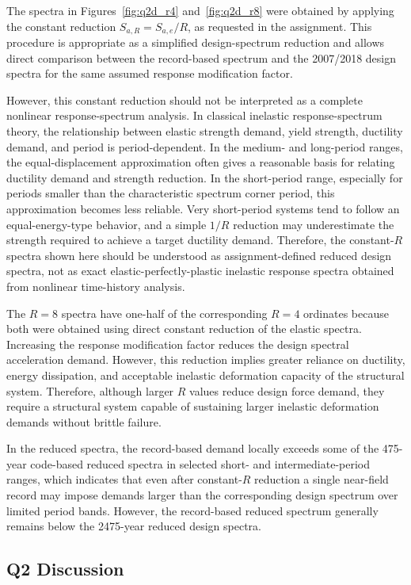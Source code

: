 ﻿\documentclass[12pt]{article}
\begin{document}
The spectra in Figures~\ref{fig:q2d_r4} and~\ref{fig:q2d_r8} were obtained by applying the constant reduction $S_{a,R}=S_{a,e}/R$, as requested in the assignment. This procedure is appropriate as a simplified design-spectrum reduction and allows direct comparison between the record-based spectrum and the 2007/2018 design spectra for the same assumed response modification factor.

However, this constant reduction should not be interpreted as a complete nonlinear response-spectrum analysis. In classical inelastic response-spectrum theory, the relationship between elastic strength demand, yield strength, ductility demand, and period is period-dependent. In the medium- and long-period ranges, the equal-displacement approximation often gives a reasonable basis for relating ductility demand and strength reduction. In the short-period range, especially for periods smaller than the characteristic spectrum corner period, this approximation becomes less reliable. Very short-period systems tend to follow an equal-energy-type behavior, and a simple $1/R$ reduction may underestimate the strength required to achieve a target ductility demand. Therefore, the constant-$R$ spectra shown here should be understood as assignment-defined reduced design spectra, not as exact elastic-perfectly-plastic inelastic response spectra obtained from nonlinear time-history analysis.

The $R=8$ spectra have one-half of the corresponding $R=4$ ordinates because both were obtained using direct constant reduction of the elastic spectra. Increasing the response modification factor reduces the design spectral acceleration demand. However, this reduction implies greater reliance on ductility, energy dissipation, and acceptable inelastic deformation capacity of the structural system. Therefore, although larger $R$ values reduce design force demand, they require a structural system capable of sustaining larger inelastic deformation demands without brittle failure.

In the reduced spectra, the record-based demand locally exceeds some of the 475-year code-based reduced spectra in selected short- and intermediate-period ranges, which indicates that even after constant-$R$ reduction a single near-field record may impose demands larger than the corresponding design spectrum over limited period bands. However, the record-based reduced spectrum generally remains below the 2475-year reduced design spectra.
\subsection{Q2 Discussion}
\end{document}
